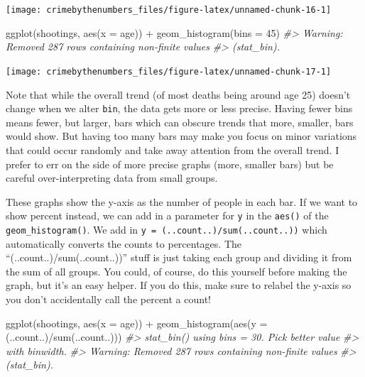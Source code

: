 \documentclass[
  12pt,
  openany]{book}
\newenvironment{Shaded}{\begin{snugshade}}{\end{snugshade}}
\newcommand{\AttributeTok}[1]{\textcolor[rgb]{0.61,0.61,0.61}{#1}}
\newcommand{\CommentTok}[1]{\textcolor[rgb]{0.37,0.37,0.37}{\textit{#1}}}
\newcommand{\DecValTok}[1]{\textcolor[rgb]{0.06,0.06,0.06}{#1}}
\newcommand{\FunctionTok}[1]{\textcolor[rgb]{0,0,0}{#1}}
\newcommand{\NormalTok}[1]{#1}
\newcommand{\SpecialCharTok}[1]{\textcolor[rgb]{0,0,0}{#1}}
\begin{document}
\begin{center}\texttt{[image: crimebythenumbers\_files/figure-latex/unnamed-chunk-16-1]} \end{center}

\begin{Shaded}
\begin{Highlighting}[]
\FunctionTok{ggplot}\NormalTok{(shootings, }\FunctionTok{aes}\NormalTok{(}\AttributeTok{x =}\NormalTok{ age)) }\SpecialCharTok{+} 
  \FunctionTok{geom\_histogram}\NormalTok{(}\AttributeTok{bins =} \DecValTok{45}\NormalTok{)}
\CommentTok{\#\textgreater{} Warning: Removed 287 rows containing non{-}finite values}
\CommentTok{\#\textgreater{} (stat\_bin).}
\end{Highlighting}
\end{Shaded}

\begin{center}\texttt{[image: crimebythenumbers\_files/figure-latex/unnamed-chunk-17-1]} \end{center}

Note that while the overall trend (of most deaths being around age 25) doesn't change when we alter \texttt{bin}, the data gets more or less precise. Having fewer bins means fewer, but larger, bars which can obscure trends that more, smaller, bars would show. But having too many bars may make you focus on minor variations that could occur randomly and take away attention from the overall trend. I prefer to err on the side of more precise graphs (more, smaller bars) but be careful over-interpreting data from small groups.

These graphs show the y-axis as the number of people in each bar. If we want to show percent instead, we can add in a parameter for \texttt{y} in the \texttt{aes()} of the \texttt{geom\_histogram()}. We add in \texttt{y\ =\ (..count..)/sum(..count..))} which automatically converts the counts to percentages. The ``(..count..)/sum(..count..))'' stuff is just taking each group and dividing it from the sum of all groups. You could, of course, do this yourself before making the graph, but it's an easy helper. If you do this, make sure to relabel the y-axis so you don't accidentally call the percent a count!

\begin{Shaded}
\begin{Highlighting}[]
\FunctionTok{ggplot}\NormalTok{(shootings, }\FunctionTok{aes}\NormalTok{(}\AttributeTok{x =}\NormalTok{ age)) }\SpecialCharTok{+} 
  \FunctionTok{geom\_histogram}\NormalTok{(}\FunctionTok{aes}\NormalTok{(}\AttributeTok{y =}\NormalTok{ (..count..)}\SpecialCharTok{/}\FunctionTok{sum}\NormalTok{(..count..)))}
\CommentTok{\#\textgreater{} \textasciigrave{}stat\_bin()\textasciigrave{} using \textasciigrave{}bins = 30\textasciigrave{}. Pick better value}
\CommentTok{\#\textgreater{} with \textasciigrave{}binwidth\textasciigrave{}.}
\CommentTok{\#\textgreater{} Warning: Removed 287 rows containing non{-}finite values}
\CommentTok{\#\textgreater{} (stat\_bin).}
\end{Highlighting}
\end{Shaded}
\end{document}
